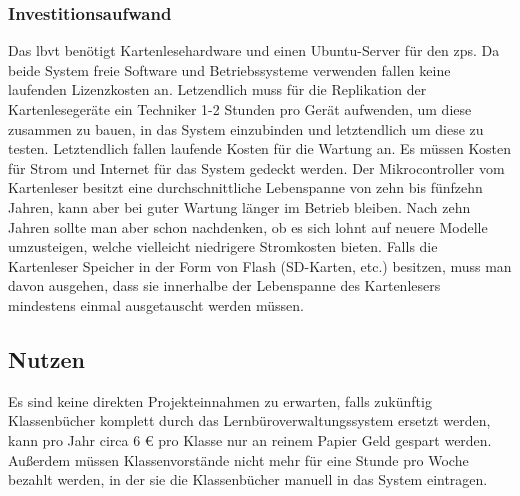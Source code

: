 \subsubsection{Investitionsaufwand}
Das \gls{lbvt} benötigt Kartenlesehardware und einen Ubuntu-Server für den \gls{zps}. Da beide System freie Software und Betriebssysteme verwenden fallen keine laufenden Lizenzkosten an. Letzendlich muss für die Replikation der Kartenlesegeräte ein Techniker 1-2 Stunden pro Gerät aufwenden, um diese zusammen zu bauen, in das System einzubinden und letztendlich um diese zu testen. Letztendlich fallen laufende Kosten für die Wartung an. Es müssen Kosten für Strom und Internet für das System gedeckt werden. Der Mikrocontroller vom Kartenleser besitzt eine durchschnittliche Lebenspanne von zehn bis fünfzehn Jahren, kann aber bei guter Wartung länger im Betrieb bleiben. Nach zehn Jahren sollte man aber schon nachdenken, ob es sich lohnt auf neuere Modelle umzusteigen, welche vielleicht niedrigere Stromkosten bieten. Falls die Kartenleser Speicher in der Form von Flash (SD-Karten, etc.) besitzen, muss man davon ausgehen, dass sie innerhalbe der Lebenspanne des Kartenlesers mindestens einmal ausgetauscht werden müssen.
\subsection{Nutzen}
Es sind keine direkten Projekteinnahmen zu erwarten, falls zukünftig Klassenbücher komplett durch das Lernbüroverwaltungssystem ersetzt werden, kann pro Jahr circa 6 € pro Klasse nur an reinem Papier Geld gespart werden. Außerdem müssen Klassenvorstände nicht mehr für eine Stunde pro Woche bezahlt werden, in der sie die Klassenbücher manuell in das System eintragen.
